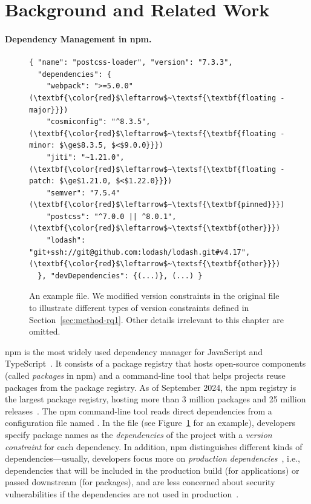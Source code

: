 \section{Background and Related Work}
\label{sec:pinning-background}

\paragraph{Dependency Management in npm.}

\begin{figure}[b]
    \scriptsize
    \centering
\begin{verbatim}
{ "name": "postcss-loader", "version": "7.3.3",
  "dependencies": {
    "webpack": ">=5.0.0"     (\textbf{\color{red}$\leftarrow$~\textsf{\textbf{floating - major}}})
    "cosmiconfig": "^8.3.5", (\textbf{\color{red}$\leftarrow$~\textsf{\textbf{floating - minor: $\ge$8.3.5, $<$9.0.0}}})
    "jiti": "~1.21.0",       (\textbf{\color{red}$\leftarrow$~\textsf{\textbf{floating - patch: $\ge$1.21.0, $<$1.22.0}}})
    "semver": "7.5.4"        (\textbf{\color{red}$\leftarrow$~\textsf{\textbf{pinned}}})
    "postcss": "^7.0.0 || ^8.0.1", (\textbf{\color{red}$\leftarrow$~\textsf{\textbf{other}}})
    "lodash": "git+ssh://git@github.com:lodash/lodash.git#v4.17", (\textbf{\color{red}$\leftarrow$~\textsf{\textbf{other}}})
  }, "devDependencies": {(...)}, (...) }
\end{verbatim}
\caption{
An example  file. 
We modified version constraints in the original file to illustrate different types of version constraints defined in Section~\ref{sec:method-rq1}. Other details irrelevant to this chapter are omitted.}
\label{fig:example-pkgjson}
\end{figure}

npm is the most widely used dependency manager for  JavaScript and TypeScript~\cite{npm}.
It consists of a package registry that hosts open-source components (called \emph{packages} in npm) and a command-line tool that helps projects reuse packages from the package registry.  
As of September 2024, the npm registry is the largest package registry, hosting more than 3 million packages and 25 million releases~\cite{module-counts}.
The npm command-line tool reads direct dependencies from a configuration file named .
In the  file (see Figure~\ref{fig:example-pkgjson} for an example), developers specify package names as the \emph{dependencies} of the project with a \emph{version constraint} for each dependency.
In addition, npm distinguishes different kinds of dependencies---usually, developers focus more on \emph{production dependencies}~\cite{DBLP:conf/kbse/LatendresseMCS22}, i.e., dependencies that will be included in the production build (for applications) or passed downstream (for packages), and are less concerned about security vulnerabilities if the dependencies are not used in production~\cite{DBLP:conf/esem/PashchenkoPPSM18, DBLP:conf/kbse/LatendresseMCS22}.

